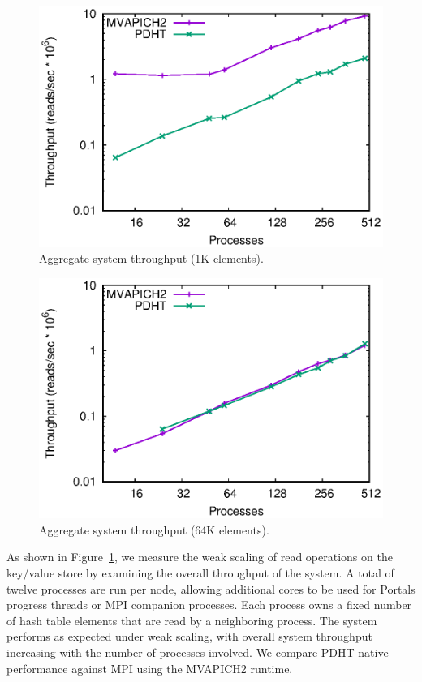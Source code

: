 \begin{figure}
    \centering
    \includegraphics[width=.9\linewidth]{plots/scaling1k}
    \caption{Aggregate system throughput (1K elements).}
    \label{fig:throughput-small}
\end{figure}

\begin{figure}
    \centering
    \includegraphics[width=.9\linewidth]{plots/scaling64}
    \caption{Aggregate system throughput (64K elements).}
    \label{fig:throughput-big}
\end{figure}

As shown in Figure~\ref{fig:throughput-small}, we measure the weak scaling
of \pdht read operations on the key/value store by examining the
overall throughput of the system. A total of twelve processes are run per node, allowing
additional cores to be used for Portals progress threads or MPI companion processes.  Each process owns a fixed number of
hash table elements that are read by a neighboring process. The
system performs as expected under weak scaling, with overall system
throughput increasing with the number of processes involved. We compare
PDHT native performance against MPI using the MVAPICH2 runtime.


